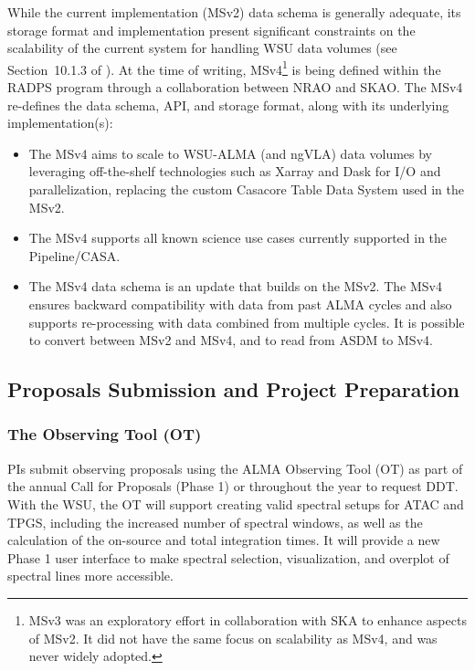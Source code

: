 While the current implementation (MSv2) data schema is generally adequate, its storage format and implementation present significant constraints on the scalability of the current system for handling WSU data volumes (see Section~10.1.3 of \cite{CSA-IA}). At the time of writing, MSv4\footnote{MSv3 was an exploratory effort in collaboration with SKA to enhance aspects of MSv2. It did not have the same focus on scalability as MSv4, and was never widely adopted.} is being defined within the RADPS program through a collaboration between NRAO and SKAO. The MSv4 re-defines the data schema, API, and storage format, along with its  underlying implementation(s):
\begin{itemize}[itemsep=-0.5em]
\item The MSv4 aims to scale to WSU-ALMA (and ngVLA) data volumes by leveraging off-the-shelf technologies such as Xarray and Dask for I/O and parallelization, replacing the custom Casacore Table Data System used in the MSv2.
\item The MSv4 supports all known science use cases currently supported in the Pipeline/CASA.
\item The MSv4 data schema is an update that builds on the MSv2. The MSv4 ensures backward compatibility with data from past ALMA cycles and also supports re-processing with data combined from multiple cycles. It is possible to convert between MSv2 and MSv4, and to read from ASDM to MSv4.
\end{itemize}



\subsection{Proposals Submission and Project Preparation}
\subsubsection{The Observing Tool (OT)}\label{subsec:OT}

PIs submit observing proposals using the ALMA Observing Tool (OT) as part of the annual Call for Proposals (Phase 1) or throughout the year to request \ac{DDT}. With the WSU, the OT will support creating valid spectral setups for \ac{ATAC} and \ac{TPGS}, including the increased number of spectral windows, as well as the calculation of the on-source and total integration times. It will provide a new Phase 1 user interface to make spectral selection, visualization, and overplot of spectral lines more accessible.

